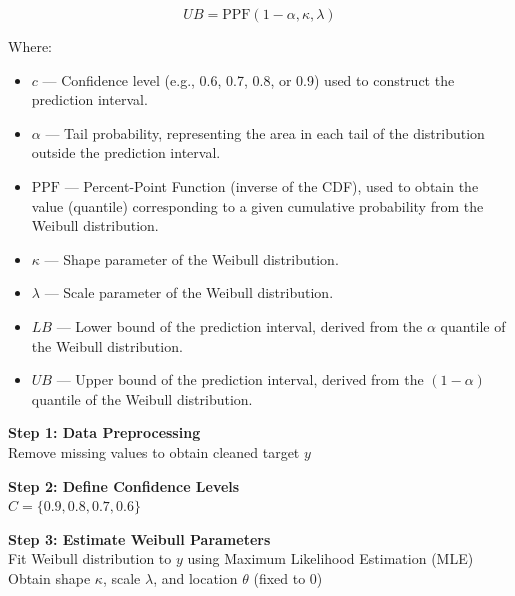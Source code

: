 \begin{itemize}
    \begin{equation}
        UB = \text{PPF}(1 - \alpha, \kappa, \lambda)
        \label{eq:weibull_ub}
    \end{equation} 

    Where:
    \vspace{0.5cm}
    \begin{itemize}
        \item $c$ — Confidence level (e.g., 0.6, 0.7, 0.8, or 0.9) used to construct the prediction interval.
        \item $\alpha$ — Tail probability, representing the area in each tail of the distribution outside the prediction interval.
        \item $\text{PPF}$ — Percent-Point Function (inverse of the CDF), used to obtain the value (quantile) corresponding to a given cumulative probability from the Weibull distribution.
        \item $\kappa$ — Shape parameter of the Weibull distribution.
        \item $\lambda$ — Scale parameter of the Weibull distribution.
        \item $LB$ — Lower bound of the prediction interval, derived from the $\alpha$ quantile of the Weibull distribution.
        \item $UB$ — Upper bound of the prediction interval, derived from the $(1 - \alpha)$ quantile of the Weibull distribution.
    \end{itemize}

    
        \begin{algorithm}[H]
        \footnotesize
        \SetAlgoCaptionSeparator{:}
    
    
        \textbf{Step 1: Data Preprocessing}\\
        Remove missing values to obtain cleaned target $y$
    
        \textbf{Step 2: Define Confidence Levels}\\
        $C = \{0.9, 0.8, 0.7, 0.6\}$
    
        \textbf{Step 3: Estimate Weibull Parameters}\\
        Fit Weibull distribution to $y$ using Maximum Likelihood Estimation (MLE)\\
        Obtain shape $\kappa$, scale $\lambda$, and location $\theta$ (fixed to 0)
    

\end{algorithm}
\end{itemize}
